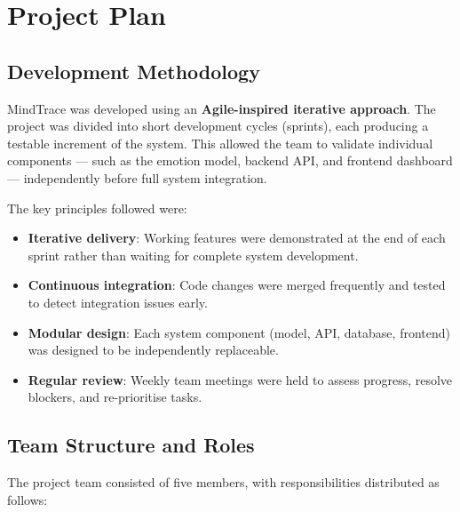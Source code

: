 \chapter{Project Plan}


\section{Development Methodology}

MindTrace was developed using an \textbf{Agile-inspired iterative approach}.
The project was divided into short development cycles (sprints), each
producing a testable increment of the system. This allowed the team to
validate individual components — such as the emotion model, backend API,
and frontend dashboard — independently before full system integration.

The key principles followed were:
\begin{itemize}
    \item \textbf{Iterative delivery}: Working features were demonstrated
          at the end of each sprint rather than waiting for complete system
          development.
    \item \textbf{Continuous integration}: Code changes were merged
          frequently and tested to detect integration issues early.
    \item \textbf{Modular design}: Each system component (model, API,
          database, frontend) was designed to be independently replaceable.
    \item \textbf{Regular review}: Weekly team meetings were held to
          assess progress, resolve blockers, and re-prioritise tasks.
\end{itemize}

\section{Team Structure and Roles}

The project team consisted of five members, with responsibilities distributed
as follows:

